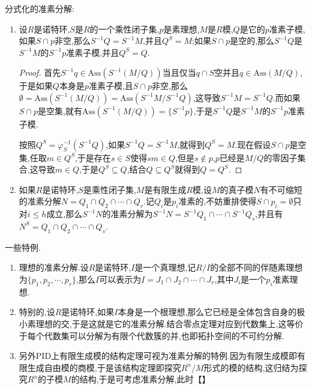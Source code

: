 分式化的准素分解:
\begin{enumerate}
	\item 设$R$是诺特环,$S$是$R$的一个乘性闭子集,$p$是素理想,$M$是$R$模,$Q$是它的$p$准素子模,如果$S\cap p$非空,那么$S^{-1}Q=S^{-1}M$,并且$Q^S=M$;如果$S\cap p$是空的,那么$S^{-1}Q$是$S^{-1}M$的$S^{-1}p$准素子模,并且$Q^S=Q$.
	\begin{proof}
		
		首先$S^{-1}q\in\mathrm{Ass}(S^{-1}(M/Q))$当且仅当$q\cap S$空并且$q\in\mathrm{Ass}(M/Q)$,于是如果$Q$本身是$p$准素子模,且$S\cap p$非空,那么$\emptyset=\mathrm{Ass}(S^{-1}(M/Q))=\mathrm{Ass}(S^{-1}M/S^{-1}Q)$,这导致$S^{-1}M=S^{-1}Q$.而如果$S\cap p$是空集,就有$\mathrm{Ass}(S^{-1}(M/Q))=\{S^{-1}p\}$,于是$S^{-1}Q$是$S^{-1}M$的$S^{-1}p$准素子模.
		
		按照$Q^S=\varphi_S^{-1}(S^{-1}Q)$,如果$S^{-1}Q=S^{-1}M$,就得到$Q^S=M$.现在假设$S\cap p$是空集,任取$m\in Q^S$,于是存在$s\in S$使得$sm\in Q$,但是$s\not\in p$,$p$已经是$M/Q$的零因子集合,这导致$m\in Q$,于是$Q^S\subseteq Q$,结合$Q\subseteq Q^S$就得到$Q=Q^S$.
	\end{proof}
	\item 如果$R$是诺特环,$S$是乘性闭子集,$M$是有限生成$R$模,设$M$的真子模$N$有不可缩短的准素分解$N=Q_1\cap Q_2\cap\cdots\cap Q_r$.记$Q_i$是$p_i$准素的,不妨重排使得$S\cap p_i=\emptyset$只对$i\le h$成立,那么$S^{-1}N$的准素分解为$S^{-1}N=S^{-1}Q_1\cap\cdots\cap S^{-1}Q_s$,并且有$N^S=Q_1\cap Q_2\cap\cdots\cap Q_s$.
\end{enumerate}

一些特例.
\begin{enumerate}
	\item 理想的准素分解.设$R$是诺特环,$I$是一个真理想,记$R/I$的全部不同的伴随素理想为$\{p_1,p_2,\cdots,p_r\}$,那么$I$可以表示为$I=J_1\cap J_2\cap\cdots\cap J_r$,其中$J_i$是一个$p_i$准素理想.
	\item 特别的,设$R$是诺特环,如果$I$本身是一个根理想,那么它已经是全体包含自身的极小素理想的交,于是这就是它的准素分解.结合零点定理对应到代数集上,这等价于每个代数集可以分解为有限个代数簇的并,也即拓扑空间的不可约分解.
	\item 另外PID上有限生成模的结构定理可视为准素分解的特例.因为有限生成模即有限生成自由模的商模,于是该结构定理即探究$R^n/M$形式的模的结构,这归结为探究$R^n$的子模$M$的结构,于是可考虑准素分解,此时【】
\end{enumerate}

